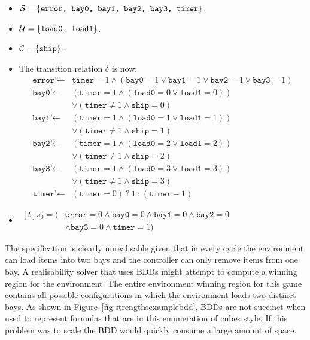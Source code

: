 \begin{itemize}
    \item $\mathcal{S} = \{ \texttt{error, bay0, bay1, bay2, bay3, timer} \} $.
    \item $\mathcal{U} = \{ \texttt{load0, load1} \} $. 
    \item $\mathcal{C} = \{ \texttt{ship} \}$.
    \item The transition relation $\delta$ is now: 
        \begin{align*}
            \texttt{error'} \gets {}& \texttt{timer} = 1 \land (\texttt{bay0} = 1 \lor \texttt{bay1} = 1 \lor \texttt{bay2} = 1 \lor \texttt{bay3} = 1 ) \\
            \texttt{bay0'} \gets {}& (\texttt{timer} = 1 \land (\texttt{load0} = 0 \lor \texttt{load1} = 0)) \\
            {}& \lor (\texttt{timer}\neq1 \land \texttt{ship} = 0) \\
            \texttt{bay1'} \gets {}& (\texttt{timer} = 1 \land (\texttt{load0} = 1 \lor \texttt{load1} = 1)) \\
            {}& \lor (\texttt{timer}\neq1 \land \texttt{ship} = 1) \\
            \texttt{bay2'} \gets {}& (\texttt{timer} = 1 \land (\texttt{load0} = 2 \lor \texttt{load1} = 2)) \\
            {}& \lor (\texttt{timer}\neq1 \land \texttt{ship} = 2) \\
            \texttt{bay3'} \gets {}& (\texttt{timer} = 1 \land (\texttt{load0} = 3 \lor \texttt{load1} = 3)) \\
            {}& \lor (\texttt{timer}\neq1 \land \texttt{ship} = 3) \\
            \texttt{timer'} \gets {}& (\texttt{timer} = 0)\ \texttt{?}\ 1\ \texttt{:}\ (\texttt{timer} - 1)
        \end{align*}
    \item $\begin{aligned}[t]
            s_0 = ({}& \texttt{error} = 0 \land \texttt{bay0} = 0 \land \texttt{bay1} = 0 \land \texttt{bay2} = 0 \\
            {}&\land \texttt{bay3} = 0 \land \texttt{timer} = 1)
        \end{aligned}$
\end{itemize}

The specification is clearly unrealisable given that in every cycle the environment can load items into two bays and the controller can only remove items from one bay. A realisability solver that uses BDDs might attempt to compute a winning region for the environment. The entire environment winning region for this game contains all possible configurations in which the environment loads two distinct bays. As shown in Figure~\ref{fig:strengthsexamplebdd}, BDDs are not succinct when used to represent formulas that are in this enumeration of cubes style. If this problem was to scale the BDD would quickly consume a large amount of space.

